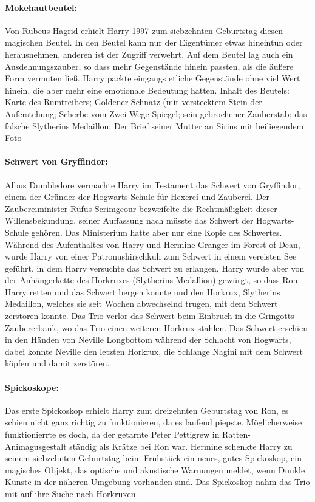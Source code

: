 \documentclass[a4paper, 10pt]{article}
\begin{document}
\paragraph{Mokehautbeutel:}
Von Rubeus Hagrid erhielt Harry 1997 zum siebzehnten Geburtstag diesen magischen Beutel. In den Beutel kann nur der Eigentümer etwas hineintun oder herausnehmen, anderen ist der Zugriff verwehrt. Auf dem Beutel lag auch ein Ausdehnungszauber, so dass mehr Gegenstände hinein passten, als die äußere Form vermuten ließ. Harry packte eingangs etliche Gegenstände ohne viel Wert hinein, die aber mehr eine emotionale Bedeutung hatten.
Inhalt des Beutels: Karte des Rumtreibers; Goldener Schnatz (mit verstecktem Stein der Auferstehung; Scherbe vom Zwei-Wege-Spiegel; sein gebrochener Zauberstab; das falsche Slytherins Medaillon; Der Brief seiner Mutter an Sirius mit beiliegendem Foto
\paragraph{Schwert von Gryffindor:}
Albus Dumbledore vermachte Harry im Testament das Schwert von Gryffindor, einem der Gründer der Hogwarts-Schule für Hexerei und Zauberei. Der Zaubereiminister Rufus Scrimgeour bezweifelte die Rechtmäßigkeit dieser Willensbekundung, seiner Auffassung nach müsste das Schwert der Hogwarts-Schule gehören. Das Ministerium hatte aber nur eine Kopie des Schwertes. Während des Aufenthaltes von Harry und Hermine Granger im Forest of Dean, wurde Harry von einer Patronushirschkuh zum Schwert in einem vereisten See geführt, in dem Harry versuchte das Schwert zu erlangen, Harry wurde aber von der Anhängerkette des Horkruxes (Slytherins Medallion) gewürgt, so dass Ron Harry retten und das Schwert bergen konnte und den Horkrux, Slytherins Medaillon, welches sie seit Wochen abwechselnd trugen, mit dem Schwert zerstören konnte. Das Trio verlor das Schwert beim Einbruch in die Gringotts Zaubererbank, wo das Trio einen weiteren Horkrux stahlen. Das Schwert erschien in den Händen von Neville Longbottom während der Schlacht von Hogwarts, dabei konnte Neville den letzten Horkrux, die Schlange Nagini mit dem Schwert köpfen und damit zerstören.
\paragraph{Spickoskope:}
Das erste Spickoskop erhielt Harry zum dreizehnten Geburtstag von Ron, es schien nicht ganz richtig zu funktionieren, da es laufend piepste. Möglicherweise funktionierrte es doch, da der getarnte Peter Pettigrew in Ratten-Animagusgestalt ständig als Krätze bei Ron war. Hermine schenkte Harry zu seinem siebzehnten Geburtstag beim Frühstück ein neues, gutes Spickoskop, ein magisches Objekt, das optische und akustische Warnungen meldet, wenn Dunkle Künste in der näheren Umgebung vorhanden sind. Das Spickoskop nahm das Trio mit auf ihre Suche nach Horkruxen.
\end{document}
